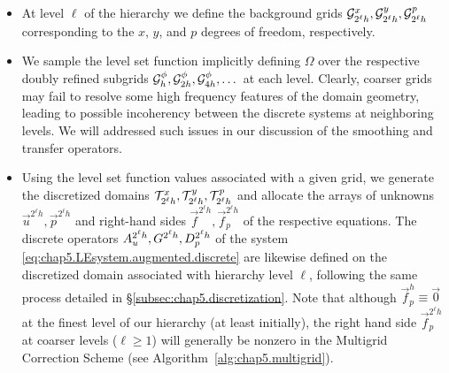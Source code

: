 \begin{itemize}

\item At level $\ell$ of the hierarchy we define the background grids $\mathcal{G}^x_{2^{\ell}h}, \mathcal{G}^y_{2^{\ell}h}, \mathcal{G}^p_{2^{\ell}h}$ corresponding to the $x$, $y$, and $p$ degrees of freedom, respectively.

\item We sample the level set function implicitly defining $\Omega$ over the respective doubly refined subgrids $\mathcal{G}^\phi_h, \mathcal{G}^\phi_{2h}, \mathcal{G}^\phi_{4h}, \dotsc$ at each level. Clearly, coarser grids may fail to resolve some high frequency features of the domain geometry, leading to possible incoherency between the discrete systems at neighboring levels. We will addressed such issues in our discussion of the smoothing and transfer operators.

\item Using the level set function values associated with a given grid, we generate the discretized domains $\mathcal{T}^x_{2^{\ell}h}, \mathcal{T}^y_{2^{\ell}h}, \mathcal{T}^p_{2^{\ell}h}$ and allocate the arrays of unknowns $\vec{u}^{2^{\ell}h}, \vec{p}^{2^{\ell}h}$ and right-hand sides $\vec{f}^{2^{\ell}h}, \vec{f}_p^{2^{\ell}h}$ of the respective equations. The discrete operators $A_u^{2^{\ell}h}, \linebreak[0] G^{2^{\ell}h}, \linebreak[0] D_p^{2^{\ell}h}$ of the system \eqref{eq:chap5.LEsystem.augmented.discrete} are likewise defined on the discretized domain associated with hierarchy level $\ell$, following the same process detailed in \S\ref{subsec:chap5.discretization}. Note that although $\vec{f}_p^h \equiv \vec{0}$ at the finest level of our hierarchy (at least initially), the right hand side $\vec{f}_p^{2^{\ell}h}$ at coarser levels ($\ell \geq 1$) will generally be nonzero in the Multigrid Correction Scheme (see Algorithm~\ref{alg:chap5.multigrid}).

\end{itemize}

